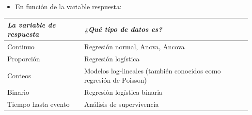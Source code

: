 \documentclass[]{book}
\providecommand{\tightlist}{%
  \setlength{\itemsep}{0pt}\setlength{\parskip}{0pt}}
\begin{document}
~

\begin{itemize}
\tightlist
\item
  En función de la variable respuesta:
\end{itemize}

\begin{longtable}[]{@{}ll@{}}
\toprule
\begin{minipage}[b]{0.36\columnwidth}\raggedright\strut
\emph{La variable de respuesta}\strut
\end{minipage} & \begin{minipage}[b]{0.59\columnwidth}\raggedright\strut
\emph{¿Qué tipo de datos es?}\strut
\end{minipage}\tabularnewline
\midrule
\endhead
\begin{minipage}[t]{0.36\columnwidth}\raggedright\strut
Continuo\strut
\end{minipage} & \begin{minipage}[t]{0.59\columnwidth}\raggedright\strut
Regresión normal, Anova, Ancova\strut
\end{minipage}\tabularnewline
\begin{minipage}[t]{0.36\columnwidth}\raggedright\strut
Proporción\strut
\end{minipage} & \begin{minipage}[t]{0.59\columnwidth}\raggedright\strut
Regresión logística\strut
\end{minipage}\tabularnewline
\begin{minipage}[t]{0.36\columnwidth}\raggedright\strut
Conteos\strut
\end{minipage} & \begin{minipage}[t]{0.59\columnwidth}\raggedright\strut
Modelos log-lineales (también conocidos como regresión de Poisson)\strut
\end{minipage}\tabularnewline
\begin{minipage}[t]{0.36\columnwidth}\raggedright\strut
Binario\strut
\end{minipage} & \begin{minipage}[t]{0.59\columnwidth}\raggedright\strut
Regresión logística binaria\strut
\end{minipage}\tabularnewline
\begin{minipage}[t]{0.36\columnwidth}\raggedright\strut
Tiempo hasta evento\strut
\end{minipage} & \begin{minipage}[t]{0.59\columnwidth}\raggedright\strut
Análisis de supervivencia\strut
\end{minipage}\tabularnewline
\bottomrule
\end{longtable}
\end{document}
